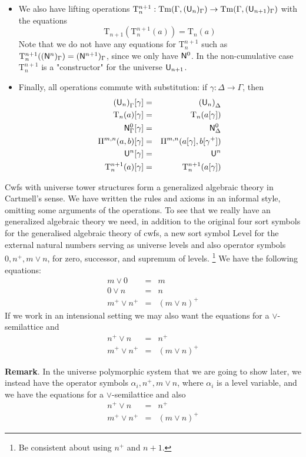 \documentclass{lmcs}
\newcommand{\Ta}{\mathrm{T}}
\newcommand{\Tan}{\Ta_n}
\newcommand{\Un}{\U_n}
\newcommand{\Level}{\mathrm{Level}}
\begin{document}
\begin{itemize}
\item
We also have lifting operations
$\Ta_n^{n+1} : \Tm(\Gamma,(\U_n)_\Gamma) \to  \Tm(\Gamma,(\U_{n+1})_\Gamma)$
with the equations
$$
\Ta_{n+1}(\Ta_n^{n+1}(a)) = \Ta_n(a)
$$
Note that we do not have any equations for $\Ta_n^{n+1}$ such as
$\Ta^{n+1}_n((\N^n)_\Gamma) = (\N^{n+1})_\Gamma$, since we only have $\mathsf{N}^0$. In the non-cumulative case $\Ta_n^{n+1}$ is a "constructor" for the universe $\mathsf{U}_{n+1}$.
\item
Finally, all operations commute with substitution: if $\gamma : \Delta \to \Gamma$, then
\begin{eqnarray*}
{(\Un)}_\Gamma [ \gamma ] &=& {(\Un)}_\Delta\\
\Tan(a) [ \gamma ] &=& \Tan(a[ \gamma ] )\\
\N^0_\Gamma [ \gamma ] &=&\N^0_\Delta\\
\Pi^{m,n}(a,b)[ \gamma ] &=& \Pi^{m,n}(a [ \gamma ], b[ \gamma^+ ])\\
\U^n[\gamma] &=& \U^n\\
\Ta_n^{n+1}(a)[\gamma]  &=& \Ta_n^{n+1}(a[\gamma])
\end{eqnarray*}
\end{itemize}
Cwfs with universe tower structures form a generalized algebraic theory in Cartmell's sense. We have written the rules and axioms in an informal style, omitting some arguments of the operations.
To see that we really have an generalized algebraic theory we need, in addition to the original four sort symbols for the generalised algebraic theory of cwfs, a new sort symbol $\Level$
for the external natural numbers serving as universe levels and also operator symbols $0, n^+, m \vee n$, for zero, successor, and supremum of levels. \footnote{Be consistent about using $n^+$ and $n+1$.} We have the following equations:
\begin{eqnarray*}
m \vee 0 &=&m\\
0 \vee n &=& n\\
m^+ \vee n^+ &=& (m \vee n)^+
\end{eqnarray*}
If we work in an intensional setting we may also want the equations for a $\vee$-semilattice and
\begin{eqnarray*}
n^+ \vee n &=& n^+\\
m^+ \vee n^+ &=& (m \vee n)^+
\end{eqnarray*}

{\bf Remark}. In the universe polymorphic system that we are going to show later, we instead have the operator symbols $\alpha_i, n^+, m \vee n$, where $\alpha_i$ is a level variable, and we have the equations for a $\vee$-semilattice and also 
\begin{eqnarray*}
n^+ \vee n &=& n^+\\
m^+ \vee n^+ &=& (m \vee n)^+
\end{eqnarray*}
\end{document}
